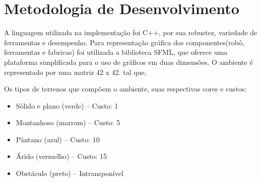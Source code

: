 \documentclass[12pt]{article}
\begin{document}
%

\section{Metodologia de Desenvolvimento} \label{sec:Desenvolv}
A linguagem utilizada na implementação foi C++, por sua robustez, variedade de ferramentas e desempenho. Para representação gráfica dos componentes(robô, ferramentas e fabricas) foi utilizada a biblioteca SFML, que oferece uma plataforma simplificada para o uso de gráficos em duas dimensões. O ambiente é representado por uma matriz 42 x 42.
%
tal que, 

Os tipos de terrenos que compõem o ambiente, suas respectivas cores e custos:
\begin{itemize}
	\item Sólido e plano (verde) – Custo: 1
	\item Montanhoso (marrom) – Custo: 5
	\item Pântano (azul) – Custo: 10
	\item Árido (vermelho) – Custo: 15
	\item Obstáculo (preto) – Intransponível
\end{itemize}
\end{document}
